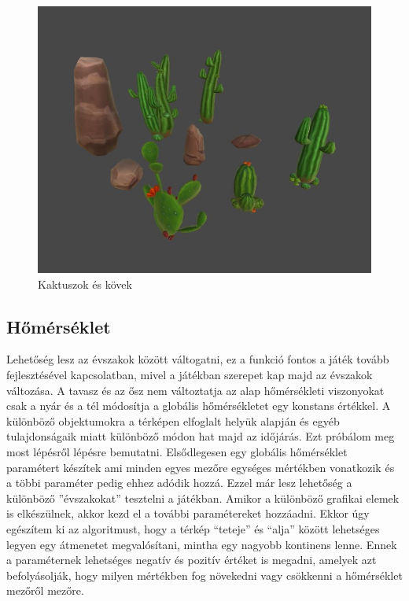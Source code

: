 \begin{figure}[h!]
\centering
\includegraphics[scale=0.4]{kepek/Cactus.JPG}
\caption{Kaktuszok és kövek}
\label{fig:Cactus}
\end{figure}

\subsection{Hőmérséklet}

Lehetőség lesz az évszakok között váltogatni, ez a funkció fontos a játék tovább fejlesztésével kapcsolatban, mivel a játékban szerepet kap majd az évszakok változása. A tavasz és az ősz nem változtatja az alap hőmérsékleti viszonyokat csak a nyár és a tél módosítja a globális hőmérsékletet egy konstans értékkel. 
\newline
\newline A különböző objektumokra a térképen elfoglalt helyük alapján és egyéb tulajdonságaik miatt különböző módon hat majd az időjárás. Ezt próbálom meg most lépésről lépésre bemutatni.
\newline
\newline Elsődlegesen egy globális hőmérséklet paramétert készítek ami minden egyes mezőre egységes mértékben vonatkozik és a többi paraméter pedig ehhez adódik hozzá. Ezzel már lesz lehetőség a különböző ''évszakokat'' tesztelni a játékban. Amikor a különböző grafikai elemek is elkészülnek, akkor kezd el a további paramétereket hozzáadni.
\newline
\newline Ekkor úgy egészítem ki az algoritmust, hogy a térkép “teteje” és “alja” között lehetséges legyen egy átmenetet megvalósítani, mintha egy nagyobb kontinens lenne. Ennek a paraméternek lehetséges negatív és pozitív értéket is megadni, amelyek azt befolyásolják, hogy milyen mértékben fog növekedni vagy csökkenni a hőmérséklet mezőről mezőre.

